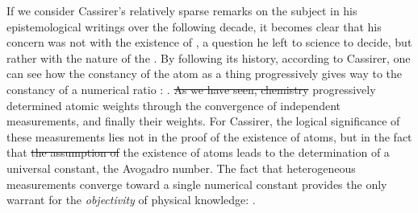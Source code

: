 \documentclass[submitted,12pt]{article}
\providecommand{\DIFadd}[1]{{\protect\color{blue}\uwave{#1}}} %
\providecommand{\DIFdel}[1]{{\protect\color{red}\sout{#1}}}                      %
\providecommand{\DIFaddbegin}{} %
\providecommand{\DIFaddend}{} %
\providecommand{\DIFdelbegin}{} %
\providecommand{\DIFdelend}{} %
\begin{document}
If we consider Cassirer’s relatively sparse remarks on the subject in his epistemological writings over the following decade, it becomes clear that his concern was not with the existence of , a question he left to science to decide, but rather with the nature of the  . By following its history, according to Cassirer, one can see how the constancy of the atom as a thing  progressively gives way to the constancy of a numerical ratio : \DIFdelbegin %
\DIFdelend \DIFaddbegin {} \DIFaddend {}. \DIFdelbegin \DIFdel{As we have seen, chemistry }\DIFdelend \DIFaddbegin \DIFadd{Chemistry }\DIFaddend progressively determined  atomic weights through the convergence of independent measurements, and finally their  weights. For Cassirer, the logical significance of these measurements lies not in the proof of the existence of atoms, but in the fact that \DIFdelbegin \DIFdel{the assumption of }\DIFdelend \DIFaddbegin \DIFadd{assuming }\DIFaddend the existence of atoms leads to the determination of a universal constant, the Avogadro number. The fact that heterogeneous measurements converge toward a single numerical constant provides the only warrant for the \emph{objectivity} of physical knowledge:   .
\end{document}

